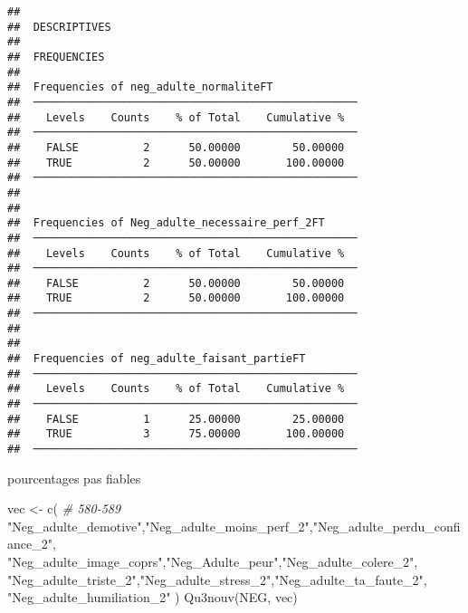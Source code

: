 \documentclass[
]{article}
\newenvironment{Shaded}{\begin{snugshade}}{\end{snugshade}}
\newcommand{\CommentTok}[1]{\textcolor[rgb]{0.56,0.35,0.01}{\textit{#1}}}
\newcommand{\FunctionTok}[1]{\textcolor[rgb]{0.00,0.00,0.00}{#1}}
\newcommand{\NormalTok}[1]{#1}
\newcommand{\OtherTok}[1]{\textcolor[rgb]{0.56,0.35,0.01}{#1}}
\newcommand{\StringTok}[1]{\textcolor[rgb]{0.31,0.60,0.02}{#1}}
\begin{document}
\begin{verbatim}
## 
##  DESCRIPTIVES
## 
##  FREQUENCIES
## 
##  Frequencies of neg_adulte_normaliteFT              
##  ────────────────────────────────────────────────── 
##    Levels    Counts    % of Total    Cumulative %   
##  ────────────────────────────────────────────────── 
##    FALSE          2      50.00000        50.00000   
##    TRUE           2      50.00000       100.00000   
##  ────────────────────────────────────────────────── 
## 
## 
##  Frequencies of Neg_adulte_necessaire_perf_2FT      
##  ────────────────────────────────────────────────── 
##    Levels    Counts    % of Total    Cumulative %   
##  ────────────────────────────────────────────────── 
##    FALSE          2      50.00000        50.00000   
##    TRUE           2      50.00000       100.00000   
##  ────────────────────────────────────────────────── 
## 
## 
##  Frequencies of neg_adulte_faisant_partieFT         
##  ────────────────────────────────────────────────── 
##    Levels    Counts    % of Total    Cumulative %   
##  ────────────────────────────────────────────────── 
##    FALSE          1      25.00000        25.00000   
##    TRUE           3      75.00000       100.00000   
##  ──────────────────────────────────────────────────
\end{verbatim}

pourcentages pas fiables

\begin{Shaded}
\begin{Highlighting}[]
\NormalTok{vec }\OtherTok{\textless{}{-}} \FunctionTok{c}\NormalTok{(   }\CommentTok{\# 580{-}589}
  \StringTok{"Neg\_adulte\_demotive"}\NormalTok{,}\StringTok{"Neg\_adulte\_moins\_perf\_2"}\NormalTok{,}\StringTok{"Neg\_adulte\_perdu\_confiance\_2"}\NormalTok{,}
  \StringTok{"Neg\_adulte\_image\_coprs"}\NormalTok{,}\StringTok{"Neg\_Adulte\_peur"}\NormalTok{,}\StringTok{"Neg\_adulte\_colere\_2"}\NormalTok{,}
  \StringTok{"Neg\_adulte\_triste\_2"}\NormalTok{,}\StringTok{"Neg\_adulte\_stress\_2"}\NormalTok{,}\StringTok{"Neg\_adulte\_ta\_faute\_2"}\NormalTok{,}
  \StringTok{"Neg\_adulte\_humiliation\_2"}
\NormalTok{  )}
\FunctionTok{Qu3nouv}\NormalTok{(NEG, vec)}
\end{Highlighting}
\end{Shaded}
\end{document}
